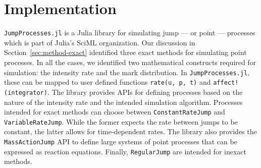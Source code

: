 \documentclass{juliacon}
\begin{document}

\section{Implementation} \label{sec:implementation}

\texttt{JumpProcesses.jl} is a Julia library for simulating jump --- or point --- processes which is part of Julia's SciML organization.
Our discussion in Section~\ref{sec:method-exact} identified three exact methods for simulating point processes. In all the cases, we identified two mathematical constructs required for simulation: the intensity rate and the mark distribution. In \texttt{JumpProcesses.jl}, these can be mapped to user defined functions \texttt{rate(u, p, t)} and \texttt{affect!(integrator)}. The library provides APIs for defining processes based on the nature of the intensity rate and the intended simulation algorithm. Processes intended for exact methods can choose between \texttt{ConstantRateJump} and \texttt{VariableRateJump}. While the former expects the rate between jumps to be constant, the latter allows for time-dependent rates. The library also provides the \texttt{MassActionJump} API to define large systems of point processes that can be expressed as reaction equations. Finally, \texttt{RegularJump} are intended for inexact methods.
\end{document}
